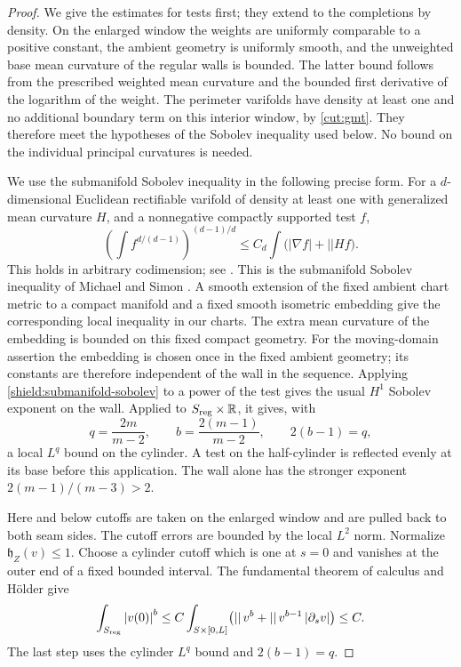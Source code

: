 \documentclass[11pt]{article}
\numberwithin{equation}{section}
\theoremstyle{definition}
\theoremstyle{remark}
\begin{document}
\begin{proof}
We give the estimates for tests first; they extend to the completions by
density.  On the enlarged window the weights are uniformly comparable
to a positive constant, the ambient geometry is uniformly smooth, and
the unweighted base mean curvature of the regular walls is bounded.
The latter bound follows from the prescribed weighted mean curvature
and the bounded first derivative of the logarithm of the weight.
The perimeter varifolds have density at least one and no additional
boundary term on this interior window, by \cref{cut:gmt}.  They therefore
meet the hypotheses of the Sobolev inequality used below.
No bound on the individual principal curvatures is needed.

We use the submanifold Sobolev inequality in the following precise form.
For a $d$-dimensional Euclidean rectifiable varifold of density at least
one with generalized mean curvature $H$, and a nonnegative compactly
supported test $f$,
\begin{equation}\label{shield:submanifold-sobolev}
 \left(\int f^{d/(d-1)}\right)^{(d-1)/d}
 \le C_d\int\bigl(\left\lvert{\nabla f}\right\rvert+\left\lvert{}\right\rvert H f\bigr).
\end{equation}
This holds in arbitrary codimension; see \citet[Chapter~4, Section~5,
Theorem~5.7]{simonGMT}. This is the submanifold Sobolev inequality
of Michael and Simon \citep{michaelSimon1973}.  A smooth extension of the fixed ambient chart
metric to a compact manifold and a fixed smooth isometric embedding
\citep{nash1956} give the corresponding local inequality in our charts.
The extra mean curvature of the embedding is bounded on this fixed
compact geometry.  For the moving-domain assertion the embedding is chosen once in the
fixed ambient geometry; its constants are therefore independent of the
wall in the sequence.  Applying
\cref{shield:submanifold-sobolev} to a power of the test gives the usual
$H^1$ Sobolev exponent on the wall.  Applied to
$S_{\rm reg}\times\mathbb R$, it gives, with
\[
 q=\frac{2m}{m-2},\qquad b=\frac{2(m-1)}{m-2},
 \qquad 2(b-1)=q,
\]
a local $L^q$ bound on the cylinder.  A test on the half-cylinder is
reflected evenly at its base before this application.  The wall alone
has the stronger exponent $2(m-1)/(m-3)>2$.

Here and below cutoffs are taken on the enlarged window and are pulled
back to both seam sides.  The cutoff errors are bounded by the local
$L^2$ norm.  Normalize $\mathfrak h_Z(v)\le1$.  Choose a cylinder cutoff
which is one at $s=0$ and vanishes at the outer end of a fixed bounded
interval.  The fundamental theorem of calculus and H\"older give
\begin{equation}\label{shield:trace}
 \int_{S_{\rm reg}}\left\lvert{v(0)}\right\rvert^b
 \le C\int_{S\times[0,L]}
       \bigl(\left\lvert{}\right\rvert v^b+\left\lvert{}\right\rvert v^{b-1}\left\lvert{\partial_s v}\right\rvert\bigr)
 \le C.
\end{equation}
The last step uses the cylinder $L^q$ bound and $2(b-1)=q$.


\end{proof}
\end{document}
